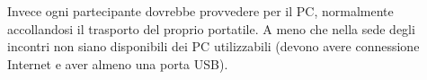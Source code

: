 \documentclass[a4paper,12pt]{article}
\begin{document}
Invece ogni partecipante dovrebbe provvedere per il PC, normalmente 
accollandosi il trasporto del proprio portatile. A meno che nella sede degli 
incontri non siano disponibili dei PC utilizzabili (devono avere connessione 
Internet e aver almeno una porta USB).

% 
% 
% 
% 
% 
% 
\end{document}
